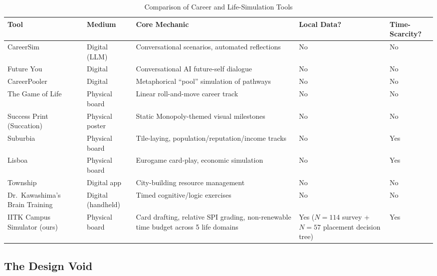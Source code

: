 \begin{table}[htbp]
\centering
\caption{Comparison of Career and Life-Simulation Tools}
\label{tab:existing_tools}
\small
\begin{tabular}{@{}p{3cm}p{1.8cm}p{4cm}p{2cm}p{2cm}@{}}
\toprule
\textbf{Tool} & \textbf{Medium} & \textbf{Core Mechanic} & \textbf{Local Data?} & \textbf{Time-Scarcity?} \\
\midrule
CareerSim~\cite{Du-2024} & Digital (LLM) & Conversational scenarios, automated reflections & No & No \\
\addlinespace
Future You~\cite{Pataranutaporn-2024} & Digital & Conversational AI future-self dialogue & No & No \\
\addlinespace
CareerPooler~\cite{Wang-2025-CareerPooler} & Digital & Metaphorical ``pool'' simulation of pathways & No & No \\
\addlinespace
The Game of Life & Physical board & Linear roll-and-move career track & No & No \\
\addlinespace
Success Print (Succation)~\cite{SuccessPrint-2024} & Physical poster & Static Monopoly-themed visual milestones & No & No \\
\addlinespace
Suburbia~\cite{Sousa-2021} & Physical board & Tile-laying, population/reputation/income tracks & No & Yes \\
\addlinespace
Lisboa~\cite{Sousa-2021} & Physical board & Eurogame card-play, economic simulation & No & Yes \\
\addlinespace
Township~\cite{Dhar-2022} & Digital app & City-building resource management & No & No \\
\addlinespace
Dr.\ Kawashima's Brain Training~\cite{Main-2011, Main-2017} & Digital (handheld) & Timed cognitive/logic exercises & No & No \\
\addlinespace
IITK Campus Simulator (ours) & Physical board & Card drafting, relative SPI grading, non-renewable time budget across 5 life domains & Yes ($N=114$ survey + $N=57$ placement decision tree) & Yes \\
\bottomrule
\end{tabular}
\end{table}

\subsection{The Design Void}

